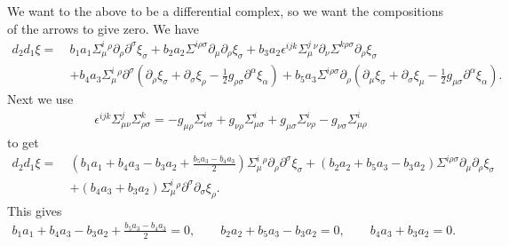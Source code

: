\documentclass[10pt]{report}
\theoremstyle{definition}
\begin{document}
We want to the above to be a differential complex, so we want the compositions of the arrows to give zero. We have
\begin{align}
d_2 d_1 \xi =\ & b_1 a_1 \Sigma^i_\mu{}^\rho \partial_\rho \partial^\sigma \xi_\sigma + b_2 a_2 \Sigma^{i\rho\sigma} \partial_\mu \partial_\rho \xi_\sigma + b_3 a_2 \epsilon^{ijk} \Sigma^j_\mu{}^\nu \partial_\nu \Sigma^{k\rho\sigma} \partial_\rho \xi_\sigma \\ \nonumber &
+ b_4 a_3 \Sigma^i_\mu{}^\rho \partial^\sigma (\partial_\rho \xi_\sigma + \partial_\sigma \xi_\rho- \frac{1}{2} g_{\rho\sigma}\partial^\alpha \xi_\alpha ) 
+ b_5 a_3 \Sigma^{i\rho\sigma} \partial_\rho (\partial_\mu \xi_\sigma + \partial_\sigma \xi_\mu- \frac{1}{2} g_{\mu\sigma}\partial^\alpha \xi_\alpha).
\end{align}
Next we use
\begin{align}
\epsilon^{ijk} \Sigma^j_{\mu\nu}  \Sigma^{k}_{\rho\sigma} = - g_{\mu\rho} \Sigma^i_{\nu\sigma} + g_{\nu\rho} \Sigma^i_{\mu\sigma} + g_{\mu\sigma} \Sigma^i_{\nu\rho} - g_{\nu\sigma} \Sigma^i_{\mu\rho}
\end{align}
to get
\begin{align}
d_2 d_1 \xi =\ & (b_1 a_1+b_4 a_3-b_3 a_2 + \frac{b_5 a_3 - b_4 a_3}{2}) \Sigma^i_\mu{}^\rho \partial_\rho \partial^\sigma \xi_\sigma + (b_2 a_2+b_5 a_3-b_3 a_2) \Sigma^{i\rho\sigma} \partial_\mu \partial_\rho \xi_\sigma \\ \nonumber &
+ (b_4 a_3+b_3 a_2) \Sigma^i_\mu{}^\rho \partial^\sigma \partial_\sigma \xi_\rho.
\end{align}
This gives
\begin{align}\label{eqs-b1}
b_1 a_1+b_4 a_3-b_3 a_2+ \frac{b_5 a_3 - b_4 a_3}{2}=0, \qquad b_2 a_2+b_5 a_3-b_3 a_2=0, \qquad b_4 a_3+b_3 a_2=0.
\end{align}
\end{document}
